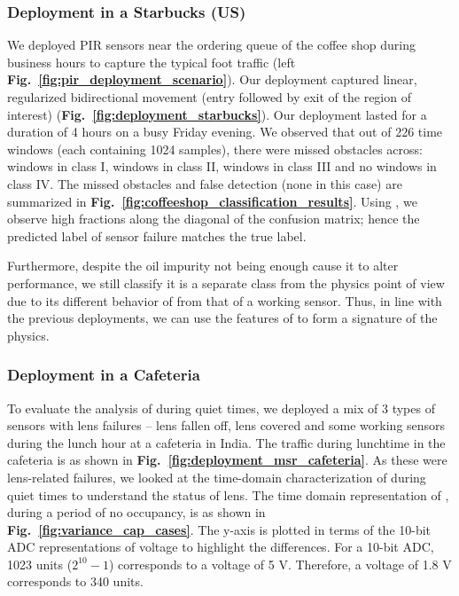 \subsubsection{Deployment in a Starbucks (US)}\label{subsubsec:starbucks} 
We deployed PIR sensors near the ordering queue of the coffee shop during business hours to capture the typical foot traffic (left {\bfseries Fig.~\ref{fig:pir_deployment_scenario}}). 
Our deployment %
captured linear, regularized bidirectional movement (entry followed by exit of the region of interest) ({\bfseries Fig.~\ref{fig:deployment_starbucks}}).
Our deployment lasted for a duration of 4 hours on a busy Friday evening. 
We observed that out of 226 time windows (each containing 1024 samples), there were missed obstacles across:  windows in class I,  windows in class II,  windows in class III and no windows in class IV. 
The missed obstacles and false detection (none in this case) are summarized in {\bfseries Fig.~\ref{fig:coffeeshop_classification_results}}. 
Using \sol, we observe high fractions along the diagonal of the confusion matrix; hence the predicted label of sensor failure matches the true label.

Furthermore, despite the oil impurity not being enough cause it to alter performance, we still classify it is a separate class from the physics point of view due to its different behavior of \aout from that of a working sensor.
Thus, in line with the previous deployments, we can use the features of \aout to form a signature of the physics. %







\subsubsection{Deployment in a Cafeteria}\label{subsubsec:cafeteria} To evaluate the analysis of \aout during quiet times, we deployed a mix of 3 types of sensors with lens failures -- lens fallen off, lens covered and some working sensors during the lunch hour at a cafeteria in India. The traffic during lunchtime in the cafeteria is as shown in {\bfseries Fig.~\ref{fig:deployment_msr_cafeteria}}. As these were lens-related failures, we looked at the time-domain characterization of \aout during quiet times to understand the status of lens. The time domain representation of \aout, during a period of no occupancy, is as shown in {\bfseries Fig.~\ref{fig:variance_cap_cases}}. The y-axis is plotted in terms of the 10-bit ADC representations of voltage to highlight the differences. For a 10-bit ADC, 1023 units (\ie $2^{10} - 1$) corresponds to a voltage of 5 V. Therefore, a voltage of 1.8 V corresponds to 340 units. 

